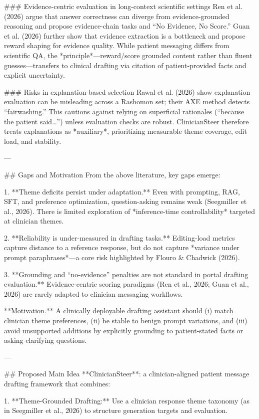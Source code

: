 ### Evidence-centric evaluation in long-context scientific settings  
Ren et al. (2026) argue that answer correctness can diverge from evidence-grounded reasoning and propose evidence-chain tasks and “No Evidence, No Score.” Guan et al. (2026) further show that evidence extraction is a bottleneck and propose reward shaping for evidence quality. While patient messaging differs from scientific QA, the *principle*—reward/score grounded content rather than fluent guesses—transfers to clinical drafting via citation of patient-provided facts and explicit uncertainty.

### Risks in explanation-based selection  
Rawal et al. (2026) show explanation evaluation can be misleading across a Rashomon set; their AXE method detects “fairwashing.” This cautions against relying on superficial rationales (“because the patient said…”) unless evaluation checks are robust. ClinicianSteer therefore treats explanations as *auxiliary*, prioritizing measurable theme coverage, edit load, and stability.

---

## Gaps and Motivation  
From the above literature, key gaps emerge:

1. **Theme deficits persist under adaptation.** Even with prompting, RAG, SFT, and preference optimization, question-asking remains weak (Seegmiller et al., 2026). There is limited exploration of *inference-time controllability* targeted at clinician themes.

2. **Reliability is under-measured in drafting tasks.** Editing-load metrics capture distance to a reference response, but do not capture *variance under prompt paraphrases*—a core risk highlighted by Flouro & Chadwick (2026).

3. **Grounding and “no-evidence” penalties are not standard in portal drafting evaluation.** Evidence-centric scoring paradigms (Ren et al., 2026; Guan et al., 2026) are rarely adapted to clinician messaging workflows.

**Motivation.** A clinically deployable drafting assistant should (i) match clinician theme preferences, (ii) be stable to benign prompt variations, and (iii) avoid unsupported additions by explicitly grounding to patient-stated facts or asking clarifying questions.

---

## Proposed Main Idea  
**ClinicianSteer**: a clinician-aligned patient message drafting framework that combines:

1. **Theme-Grounded Drafting:** Use a clinician response theme taxonomy (as in Seegmiller et al., 2026) to structure generation targets and evaluation.

